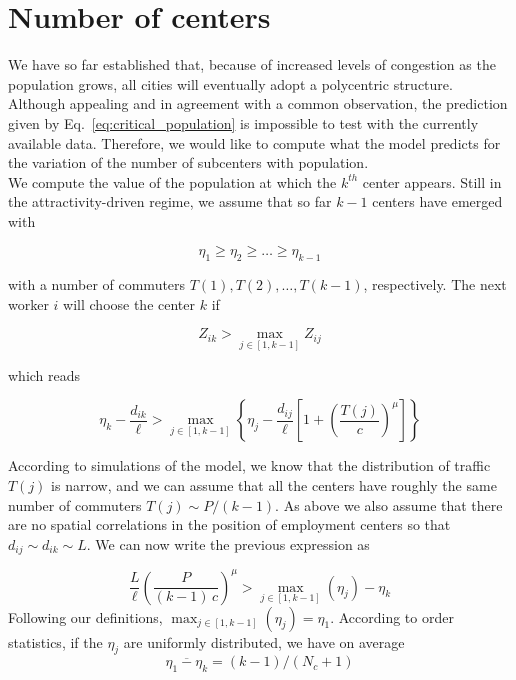\section{Number of centers}
\label{sec:number_of_centers}


We have so far established that, because of increased levels of congestion as
the population grows, all cities will eventually adopt a polycentric
structure. Although appealing and in agreement with a common observation, the
prediction given by Eq.~\ref{eq:critical_population} is impossible to test with
the currently available data. Therefore, we would like to compute what the model
predicts for the variation of the number of subcenters with population.\\

We compute the value of the population at which 
the $k^{th}$ center appears. Still in the attractivity-driven regime, we assume
that so far $k-1$
centers have emerged with 

$$\eta_{1} \geq \eta_{2} \geq \ldots \geq \eta_{k-1}$$

with a number of commuters $T(1), T(2), \ldots,
T(k-1)$, respectively. The next worker $i$ will choose the center $k$ if

\begin{equation}
    Z_{ik} > \max_{j \in \left[1,k-1\right]} Z_{ij}
\end{equation}

which reads

\begin{equation}
    \eta_k - \frac{d_{ik}}{\ell} > \max_{j \in \left[1,k-1\right]} \left\{
    \eta_j - \frac{d_{ij}}{\ell} \left[ 1 + \left(
      \frac{T(j)}{c}\right)^\mu\right] \right\}
\end{equation}

According to simulations of the model, we know that the distribution of traffic $T(j)$ is
narrow, and we can assume that all the centers have roughly the same number of
commuters $T(j) \sim P/(k-1)$. As above we also assume that there are no spatial
correlations in the position of employment centers so that $d_{ij} \sim d_{ik} \sim L$. 
We can now write the previous expression as


\begin{equation}
\frac{L}{\ell} \left( \frac{P}{(k-1)\,c} \right)^{\mu} > \max_{j \in
  \left[1,k-1\right]} \left( \eta_j \right) - \eta_k
\end{equation}
Following our definitions, $\max_{j \in \left[1,k-1\right]} \left(
\eta_j \right) = \eta_1$. According to order statistics, if the
$\eta_j$ are uniformly distributed, we have on average
$$\overline{\eta_1 - \eta_k} = (k-1)/(N_c+1)$$ 

